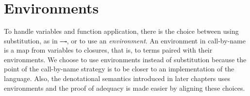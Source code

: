 \begin{fence}
\begin{code}
\AgdaSymbol{;}\AgdaSpace{}%
\AgdaSymbol{;}\AgdaSpace{}%
\AgdaOperator{\AgdaFunction{\#\AgdaUnderscore{}}}\AgdaSymbol{;}\AgdaSpace{}%
\AgdaSymbol{;}\AgdaSpace{}%
\AgdaSymbol{;}\<%
\\
%
\>[2]\AgdaSymbol{;}\AgdaSpace{}%
\AgdaSymbol{;}\AgdaSpace{}%
\AgdaSymbol{;}\AgdaSpace{}%
\AgdaSymbol{;}\AgdaSpace{}%
\AgdaSymbol{;}\AgdaSpace{}%
\AgdaSymbol{;}\AgdaSpace{}%
\AgdaSymbol{;}\AgdaSpace{}%
\AgdaSymbol{;}\AgdaSpace{}%
\AgdaSymbol{;}\AgdaSpace{}%
\AgdaSymbol{;}\AgdaSpace{}%
\AgdaSymbol{;}\AgdaSpace{}%
\AgdaSymbol{;}\<%
\\
%
\>[2]\AgdaSymbol{;}\AgdaSpace{}%
\AgdaSymbol{)}\<%
\\
\>[0]\AgdaSpace{}%
\AgdaSpace{}%
\AgdaSpace{}%
\AgdaSpace{}%
\AgdaSymbol{(}\AgdaSymbol{;}\AgdaSpace{}%
\AgdaSymbol{)}\<%
\end{code}
\end{fence}

\hypertarget{environments}{%
\section{Environments}\label{environments}}

To handle variables and function application, there is the choice
between using substitution, as in \texttt{—→}, or to use an
\emph{environment}. An environment in call-by-name is a map from
variables to closures, that is, to terms paired with their environments.
We choose to use environments instead of substitution because the point
of the call-by-name strategy is to be closer to an implementation of the
language. Also, the denotational semantics introduced in later chapters
uses environments and the proof of adequacy is made easier by aligning
these choices.

